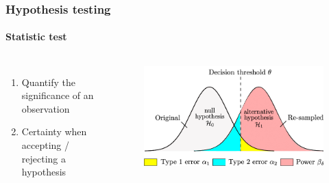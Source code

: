 \documentclass[aspectratio=43]{beamer}
\begin{document}
\begin{frame}
	
	\frametitle{Hypothesis testing}
	\framesubtitle{Statistic test}
	
	\footnotesize
	
	\begin{columns}
		
		
		\begin{enumerate}
			\item Quantify the significance of an observation
			\item Certainty when accepting / rejecting a hypothesis
		\end{enumerate}
		
		
		\begin{figure}[!htb]
		\includegraphics[width = \linewidth]{plots/part3/hypothesis.png}
		\end{figure}
	
	\end{columns}

\end{frame}
\end{document}
